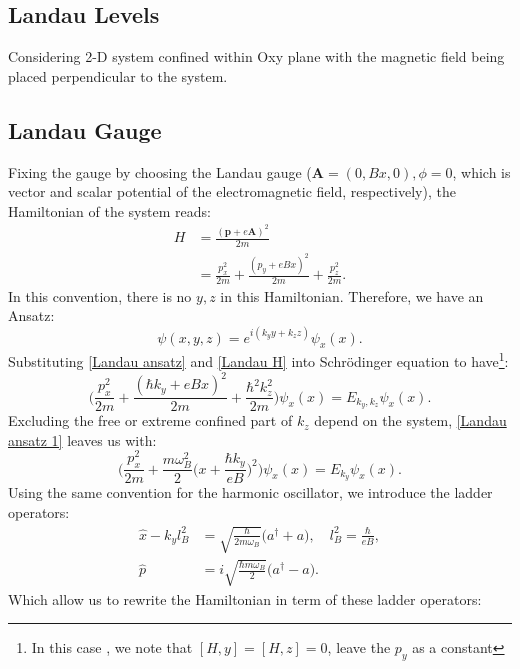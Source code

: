 \documentclass[unnumsec,webpdf,modern,large]{mam-authoring-template}%
\theoremstyle{thmstyleone}%
\theoremstyle{thmstyletwo}%
\theoremstyle{thmstylethree}%
\begin{document}
\begin{appendices}
\section{Landau Levels}\label{Landau level}
\quad Considering 2-D system confined within Oxy plane with the magnetic field being placed perpendicular to the system.
\subsection{Landau Gauge}
\quad Fixing the gauge by choosing the Landau gauge (\(\textbf{A} = (0,Bx,0), \phi = 0\), which is vector and scalar potential of the electromagnetic field, respectively), the Hamiltonian of the system reads:
\begin{align}
	H &= \frac{(\textbf{p}+e\textbf{A})^2}{2m}\nonumber\\
	\label{Landau H}
	&= \frac{p_x^2}{2m} + \frac{(p_y+eBx)^2}{2m} +\frac{p_z^2}{2m}.
\end{align}
\quad In this convention, there is no \(y, z\) in this Hamiltonian. Therefore, we have an Ansatz:
\begin{equation}\label{Landau ansatz}
	\psi(x,y,z) = e^{i(k_yy + k_z z)}\psi_x(x).
\end{equation}
\quad Substituting \eqref{Landau ansatz} and \eqref{Landau H} into Schrödinger equation to have\footnote{In this case , we note that \([H,y] = [H,z] = 0\), leave the \(p_y\) as a constant}:
\begin{equation}\label{Landau ansatz 1}
	\bigg(\frac{p_x^2}{2m} + \frac{(\hbar k_y + eBx)^2}{2m} + \frac{\hbar^2 k_z^2}{2m}\bigg)\psi_x(x) = E_{k_y,k_z}\psi_x(x).
\end{equation}
\quad Excluding the free or extreme confined part of \(k_z\) depend on the system, \eqref{Landau ansatz 1} leaves us with:
\begin{equation}\label{Landau HO}
	\bigg(\frac{p_x^2}{2m} + \frac{m\omega_B^2 }{2}\bigg(x+\frac{\hbar k_y}{eB}\bigg)^2\bigg)\psi_{x}(x) = E_{k_y} \psi_{x}(x).
\end{equation}
\quad Using the same convention for the harmonic oscillator, we introduce the ladder operators:
\begin{align}
	\hat{x}-k_y l_B^2 &= \sqrt{\frac{\hbar}{2m \omega_B}} \big(a^\dagger + a\big),\quad l_B^2 = \frac{\hbar}{eB},\\
	\hat{p} &=i\sqrt{\frac{\hbar m\omega_B}{2}}\big(a^\dagger - a\big).
\end{align}
\quad Which allow us to rewrite the Hamiltonian in term of these ladder operators:

\end{appendices}
\end{document}
